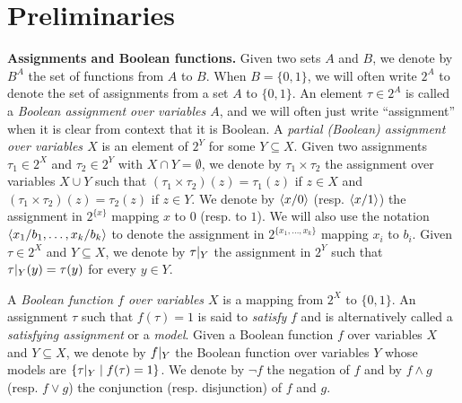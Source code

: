 \documentclass[a4paper,UKenglish,cleveref, autoref, thm-restate]{lipics-v2021}
\begin{document}
\section{Preliminaries}\label{sec:prelim}


\textbf{Assignments and Boolean functions.} Given two sets $A$ and $B$, we denote by $B^A$ the set of functions from $A$ to $B$. When $B = \{0,1\}$, we will often write $2^A$ to denote the set of assignments from a set $A$ to $\{0,1\}$. An element $\tau \in 2^A$ is called a \emph{Boolean assignment over variables $A$}, and we will often just write ``assignment'' when it is clear from context that it is Boolean. A \emph{partial (Boolean) assignment over variables $X$} is an element of $2^Y$ for some $Y \subseteq X$. Given two assignments $\tau_1 \in 2^X$ and $\tau_2 \in 2^Y$ with $X \cap Y = \emptyset$, we denote by $\tau_1 \times \tau_2$ the assignment over variables $X \cup Y$ such that $(\tau_1 \times \tau_2)(z) = \tau_1(z)$ if $z \in X$ and $(\tau_1 \times \tau_2)(z) = \tau_2(z)$ if $z \in Y$. We denote by $\ua[x][0]$ (resp. $\ua[x][1]$) the assignment in $2^{\{x\}}$ mapping $x$ to $0$ (resp. to $1$). We will also use the notation $\tup[x_1 / b_1, \dots, x_k / b_k]$ to denote the assignment in $2^{\{x_1,\dots,x_k\}}$ mapping $x_i$ to $b_i$. Given $\tau \in 2^X$ and $Y \subseteq X$, we denote by $\tau|_{Y}$ the assignment in $2^Y$ such that $\tau|_{Y}(y) = \tau(y)$ for every $y \in Y$.

A \emph{Boolean function $f$ over variables $X$} is a mapping from $2^X$ to $\{0,1\}$. An assignment $\tau$ such that $f(\tau) = 1$ is said to \emph{satisfy} $f$ and is alternatively called a \emph{satisfying assignment} or a \emph{model}. Given a Boolean function $f$ over variables $X$ and $Y \subseteq X$, we denote by $f|_{Y}$ the Boolean function over variables $Y$ whose models are $\{\tau|_{Y} \mid f(\tau)=1\}$. We denote by $\neg f$ the negation of $f$ and by $f \wedge g$ (resp. $f \vee g$) the conjunction (resp. disjunction) of $f$ and $g$. 
\end{document}
